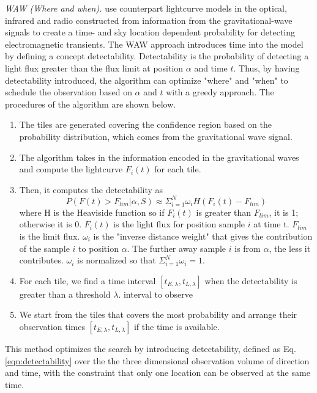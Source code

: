 \documentclass[twocolumn]{aastex61}
\begin{document}
\emph{WAW (Where and when).} \cite{SoCo2017} use counterpart lightcurve models in the optical, infrared and radio constructed from information from the gravitational-wave signals to create a time- and sky location dependent probability for detecting electromagnetic transients. The WAW approach introduces time into the model by defining a concept detectability. Detectability is the probability of detecting a light flux greater than the flux limit at position $\alpha$ and time $t$. Thus, by having detectability introduced, the algorithm can optimize "where" and "when" to schedule the observation based on $\alpha$ and $t$ with a greedy approach. The procedures of the algorithm are shown below.
\begin{enumerate}
\item The tiles are generated covering the confidence region based on the probability distribution, which comes from the gravitational wave signal.
\item The algorithm takes in the information encoded in the gravitational waves and compute the lightcurve $F_i(t)$ for each tile. 
\item Then, it computes the detectability as
\begin{equation}\label{eqn:detectability}
P(F(t) > F_{lim}|\alpha, S)\approx\Sigma_{i=1}^N\omega_i H(F_i(t)-F_{lim})
\end{equation}
where H is the Heaviside function so if $F_i(t)$ is greater than $F_{lim}$, it is 1; otherwise it is 0. $F_i(t)$ is the light flux for position sample $i$ at time t. $F_{lim}$ is the limit flux. $\omega_i$ is the "inverse distance weight" that gives the contribution of the sample $i$ to position $\alpha$. The further away sample $i$ is from $\alpha$, the less it contributes. $\omega_i$ is normalized so that $\Sigma_{i=1}^N\omega_i=1$. 
\item For each tile, we find a time interval $[t_{E,\lambda},t_{L,\lambda}]$ when the detectability is greater than a threshold $\lambda$. interval to observe
\item We start from the tiles that covers the most probability and arrange their observation times $[t_{E,\lambda},t_{L,\lambda}]$ if the time is available.
\end{enumerate}
This method optimizes the search by introducing detectability, defined as Eq.\ref{eqn:detectability} over the the three dimensional observation volume of direction and time, with the constraint that only one location can be observed at the same time.
\end{document}
